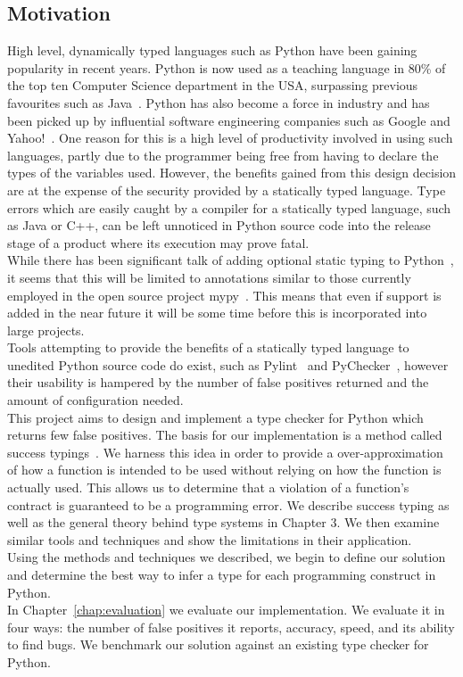 \documentclass[12pt, titlepage]{article}
\begin{document}
\subsection{Motivation}
High level, dynamically typed languages such as Python have been gaining popularity in recent years. Python is now used as a teaching language in 80\% of the top ten Computer Science department in the USA, surpassing previous favourites such as Java~\cite{guoTeaching}. Python has also become a force in industry and has been picked up by influential software engineering companies such as Google and Yahoo!~\cite{organisationsPython}. One reason for this is a high level of productivity involved in using such languages, partly due to the programmer being free from having to declare the types of the variables used. However, the benefits gained from this design decision are at the expense of the security provided by a statically typed language. Type errors which are easily caught by a compiler for a statically typed language, such as Java or C++, can be left unnoticed in Python source code into the release stage of a product where its execution may prove fatal. \\ %
\indent While there has been significant talk of adding optional static typing to Python~\cite{guido1, guido2, guido3, guidoLatest}, it seems that this will be limited to annotations similar to those currently employed in the open source project mypy~\cite{mypy}. This means that even if support is added in the near future it will be some time before this is incorporated into large projects. \\
\indent Tools attempting to provide the benefits of a statically typed language to unedited Python source code do exist, such as Pylint~\cite{pylint} and PyChecker~\cite{pychecker}, however their usability is hampered by the number of false positives returned and the amount of configuration needed. \\
\indent This project aims to design and implement a type checker for Python which returns few false positives. The basis for our implementation is a method called success typings~\cite{lindhal06}. We harness this idea in order to provide a over-approximation of how a function is intended to be used without relying on how the function is actually used. This allows us to determine that a violation of a function's contract is guaranteed to be a programming error. We describe success typing as well as the general theory behind type systems in Chapter 3. We then examine similar tools and techniques and show the limitations in their application. \\
\indent Using the methods and techniques we described, we begin to define our solution and determine the best way to infer a type for each programming construct in Python. \\
\indent In Chapter~\ref{chap:evaluation} we evaluate our implementation. We evaluate it in four ways: the number of false positives it reports, accuracy, speed, and its ability to find bugs. We benchmark our solution against an existing type checker for Python.
\end{document}

